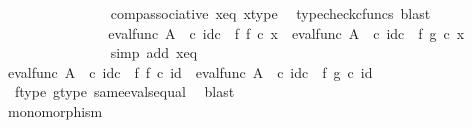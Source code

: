 \begin{isabellebody}
\ \ \ \ \ \ \ \ \ \ \ \ \ \ \isamarkupfalse%
\ comp{\isacharunderscore}{\kern0pt}associative{}\ x{\isacharunderscore}{\kern0pt}eq\ x{\isacharunderscore}{\kern0pt}type\ \isamarkupfalse%
\ {\isacharparenleft}{\kern0pt}typecheck{\isacharunderscore}{\kern0pt}cfuncs{\isacharcomma}{\kern0pt}\ blast{\isacharparenright}{\kern0pt}\isanewline
\ \ \ \ \ \ \ \ \ \ \ \ \isamarkupfalse%
\ \isamarkupfalse%
\ {\isachardoublequoteopen}{\isacharparenleft}{\kern0pt}eval{\isacharunderscore}{\kern0pt}func\ A\ {\isasymOmega}\ {\isasymcirc}\isactrlsub c\ id\isactrlsub c\ {\isasymOmega}\ {\isasymtimes}\isactrlsub f\ f{\isacharparenright}{\kern0pt}\ {\isasymcirc}\isactrlsub c\ x\ {\isacharequal}{\kern0pt}\ {\isacharparenleft}{\kern0pt}eval{\isacharunderscore}{\kern0pt}func\ A\ {\isasymOmega}\ {\isasymcirc}\isactrlsub c\ id\isactrlsub c\ {\isasymOmega}\ {\isasymtimes}\isactrlsub f\ g{\isacharparenright}{\kern0pt}\ {\isasymcirc}\isactrlsub c\ x{\isachardoublequoteclose}\isanewline
\ \ \ \ \ \ \ \ \ \ \ \ \ \ \isamarkupfalse%
\ {\isacharparenleft}{\kern0pt}simp\ add{\isacharcolon}{\kern0pt}\ x{\isacharunderscore}{\kern0pt}eq{\isacharparenright}{\kern0pt}\isanewline
\ \ \ \ \ \ \ \ \ \ \isamarkupfalse%
\isanewline
\ \ \ \ \ \ \ \ \isamarkupfalse%
\isanewline
\ \ \ \ \ \ \ \ \isamarkupfalse%
\ \isamarkupfalse%
\ {\isachardoublequoteopen}eval{\isacharunderscore}{\kern0pt}func\ A\ {\isasymOmega}\ {\isasymcirc}\isactrlsub c\ id\isactrlsub c\ {\isasymOmega}\ {\isasymtimes}\isactrlsub f\ f\ {\isasymcirc}\isactrlsub c\ id{\isacharunderscore}{\kern0pt}{}\ {\isacharequal}{\kern0pt}\ eval{\isacharunderscore}{\kern0pt}func\ A\ {\isasymOmega}\ {\isasymcirc}\isactrlsub c\ id\isactrlsub c\ {\isasymOmega}\ {\isasymtimes}\isactrlsub f\ g\ {\isasymcirc}\isactrlsub c\ id{\isacharunderscore}{\kern0pt}{}{\isachardoublequoteclose}\isanewline
\ \ \ \ \ \ \ \ \ \ \isamarkupfalse%
\ \ f{\isacharunderscore}{\kern0pt}type\ g{\isacharunderscore}{\kern0pt}type\ same{\isacharunderscore}{\kern0pt}evals{\isacharunderscore}{\kern0pt}equal\ \isamarkupfalse%
\ blast\isanewline
\ \ \ \ \ \ \ \ \isamarkupfalse%
\isanewline
\ \ \ \ \ \ \isamarkupfalse%
\isanewline
\ \ \ \ \isamarkupfalse%
\isanewline
\ \ \ \ \isamarkupfalse%
\ \isamarkupfalse%
\ {\isachardoublequoteopen}monomorphism{\isacharparenleft}{\kern0pt}{\isasymphi}{\isacharparenright}{\kern0pt}{\isachardoublequoteclose}\isanewline

\end{isabellebody}
